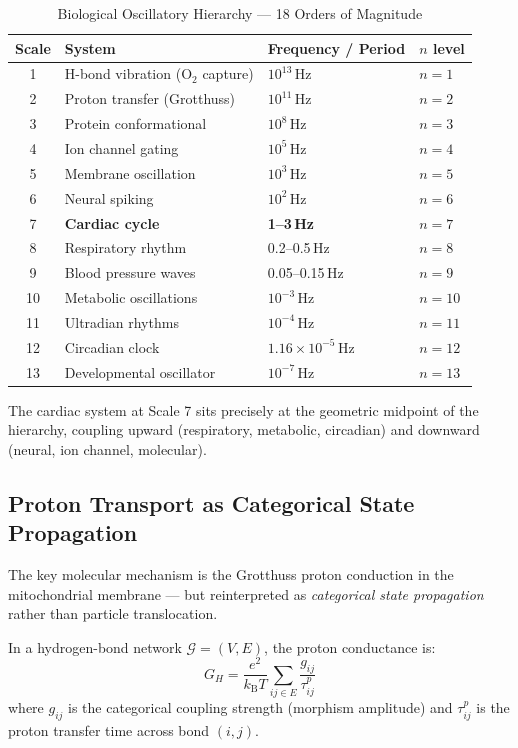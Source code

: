 \documentclass[12pt,a4paper]{article}
\theoremstyle{definition}
\newcommand{\kBT}{k_{\text{B}}T}
\begin{document}
\begin{table}[H]
\centering
\caption{Biological Oscillatory Hierarchy — 18 Orders of Magnitude}
\label{tab:hierarchy}
\begin{tabular}{clll}
\toprule
\textbf{Scale} & \textbf{System} & \textbf{Frequency / Period} & \textbf{$n$ level}\\
\midrule
1 & H-bond vibration (O$_2$ capture) & $10^{13}$\,Hz & $n=1$\\
2 & Proton transfer (Grotthuss) & $10^{11}$\,Hz & $n=2$\\
3 & Protein conformational & $10^{8}$\,Hz & $n=3$\\
4 & Ion channel gating & $10^{5}$\,Hz & $n=4$\\
5 & Membrane oscillation & $10^{3}$\,Hz & $n=5$\\
6 & Neural spiking & $10^{2}$\,Hz & $n=6$\\
7 & \textbf{Cardiac cycle} & \textbf{1--3\,Hz} & $n=7$\\
8 & Respiratory rhythm & 0.2--0.5\,Hz & $n=8$\\
9 & Blood pressure waves & 0.05--0.15\,Hz & $n=9$\\
10 & Metabolic oscillations & $10^{-3}$\,Hz & $n=10$\\
11 & Ultradian rhythms & $10^{-4}$\,Hz & $n=11$\\
12 & Circadian clock & $1.16 \times 10^{-5}$\,Hz & $n=12$\\
13 & Developmental oscillator & $10^{-7}$\,Hz & $n=13$\\
\bottomrule
\end{tabular}
\end{table}

The cardiac system at Scale 7 sits precisely at the geometric midpoint
of the hierarchy, coupling upward (respiratory, metabolic, circadian)
and downward (neural, ion channel, molecular).

\subsection{Proton Transport as Categorical State Propagation}

The key molecular mechanism is the Grotthuss proton conduction in the
mitochondrial membrane — but reinterpreted as \emph{categorical state propagation}
rather than particle translocation.

In a hydrogen-bond network $\mathcal{G} = (V, E)$, the proton conductance is:
\begin{equation}
\boxed{G_H = \frac{e^2}{\kBT} \sum_{ij \in E} \frac{g_{ij}}{\tau^p_{ij}}}
\end{equation}
where $g_{ij}$ is the categorical coupling strength (morphism amplitude) and
$\tau^p_{ij}$ is the proton transfer time across bond $(i,j)$.
\end{document}

